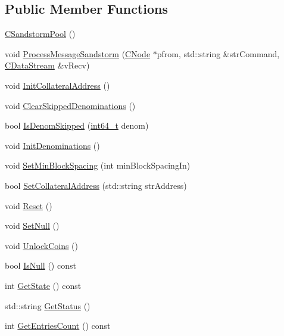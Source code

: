 \subsection*{Public Member Functions}
\begin{DoxyCompactItemize}
\item 
\hyperlink{class_c_sandstorm_pool_ace91c9528325a3469294901ffa3c472f}{C\+Sandstorm\+Pool} ()
\item 
void \hyperlink{class_c_sandstorm_pool_acf0b5b0e5703c88b7d3c9cb121ec6533}{Process\+Message\+Sandstorm} (\hyperlink{class_c_node}{C\+Node} $\ast$pfrom, std\+::string \&str\+Command, \hyperlink{class_c_data_stream}{C\+Data\+Stream} \&v\+Recv)
\item 
void \hyperlink{class_c_sandstorm_pool_aaa874c4418a12df76eddfe8faff56b67}{Init\+Collateral\+Address} ()
\item 
void \hyperlink{class_c_sandstorm_pool_afb0b7758e737f014c8a78557cea0e5ea}{Clear\+Skipped\+Denominations} ()
\item 
bool \hyperlink{class_c_sandstorm_pool_a017ee0d3f2cfee928ac1467a664ef392}{Is\+Denom\+Skipped} (\hyperlink{stdint_8h_adec1df1b8b51cb32b77e5b86fff46471}{int64\+\_\+t} denom)
\item 
void \hyperlink{class_c_sandstorm_pool_a1b40173d3fdd69fd20da1d01117a0970}{Init\+Denominations} ()
\item 
void \hyperlink{class_c_sandstorm_pool_a9be4f999ba6ac95ce4967c7b72c4c13f}{Set\+Min\+Block\+Spacing} (int min\+Block\+Spacing\+In)
\item 
bool \hyperlink{class_c_sandstorm_pool_ae46dad75c301205495960011d31242ba}{Set\+Collateral\+Address} (std\+::string str\+Address)
\item 
void \hyperlink{class_c_sandstorm_pool_ab355cf2e1380a83aec75a7cf259c86ab}{Reset} ()
\item 
void \hyperlink{class_c_sandstorm_pool_a9a220f583b730dcf9f651d340da4ee52}{Set\+Null} ()
\item 
void \hyperlink{class_c_sandstorm_pool_a0a6a14d206122f938220b23eab5e8a70}{Unlock\+Coins} ()
\item 
bool \hyperlink{class_c_sandstorm_pool_ac4eb73cecc3d383b8deae7f159711298}{Is\+Null} () const 
\item 
int \hyperlink{class_c_sandstorm_pool_aeb0427103b962d173873ab793394a103}{Get\+State} () const 
\item 
std\+::string \hyperlink{class_c_sandstorm_pool_abf8b2c93df923f599639502bfaa165ec}{Get\+Status} ()
\item 
int \hyperlink{class_c_sandstorm_pool_adb2e1bef95a98b65a8467fa0c7e8be4a}{Get\+Entries\+Count} () const 

\end{DoxyCompactItemize}
